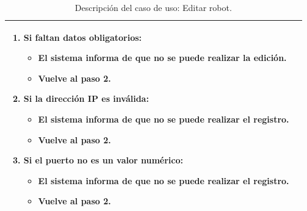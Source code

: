 \begin{table}[H]
\begin{center}
\begin{tabular}{|p{3.5cm}|p{10cm}|}
{\begin{enumerate}
         
          \item Si faltan datos obligatorios:
	  \begin{itemize}
	    \item El sistema informa de que no se puede realizar la edición.
	    \item Vuelve al paso 2.
	  \end{itemize}
	    
	  \item Si la dirección IP es inválida:
	  \begin{itemize}
	    \item El sistema informa de que no se puede realizar el registro.
	    \item Vuelve al paso 2.
	  \end{itemize}
	   
	  \item Si el puerto no es un valor numérico:
	   \begin{itemize}
	      \item El sistema informa de que no se puede realizar el registro.
	      \item Vuelve al paso 2.
	   \end{itemize}
	   
         \end{enumerate}
         }\\
     \hline
    \end{tabular}
  \end{center}
\caption{Descripción del caso de uso: Editar robot.}
\end{table}


